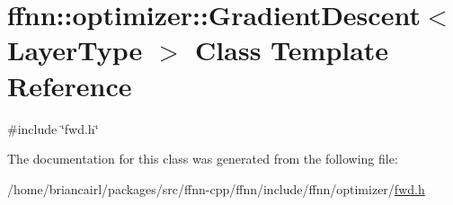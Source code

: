 \hypertarget{classffnn_1_1optimizer_1_1_gradient_descent}{\section{ffnn\-:\-:optimizer\-:\-:Gradient\-Descent$<$ Layer\-Type $>$ Class Template Reference}
\label{classffnn_1_1optimizer_1_1_gradient_descent}
}


{\ttfamily \#include \char`\"{}fwd.\-h\char`\"{}}



The documentation for this class was generated from the following file\-:\begin{DoxyCompactItemize}
\item 
/home/briancairl/packages/src/ffnn-\/cpp/ffnn/include/ffnn/optimizer/\hyperlink{fwd_8h}{fwd.\-h}\end{DoxyCompactItemize}
